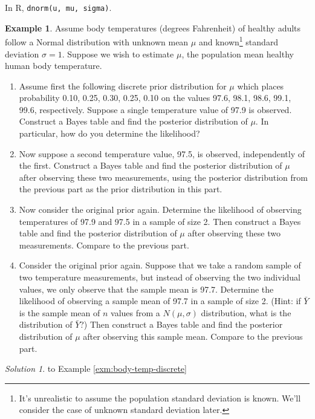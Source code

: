 \documentclass[
]{book}
\providecommand{\tightlist}{%
  \setlength{\itemsep}{0pt}\setlength{\parskip}{0pt}}
\theoremstyle{definition}
\theoremstyle{definition}
\newtheorem{example}{Example}[chapter]
\theoremstyle{definition}
\theoremstyle{remark}
\newtheorem*{solution}{Solution}
\begin{document}
In R, \texttt{dnorm(u,\ mu,\ sigma)}.

\begin{example}
\protect\hypertarget{exm:body-temp-discrete}{}{\label{exm:body-temp-discrete} }
Assume body temperatures (degrees Fahrenheit) of healthy adults follow a Normal distribution with unknown mean \(\mu\) and known\footnote{It's unrealistic to assume the population standard deviation is known. We'll consider the case of unknown standard deviation later.} standard deviation \(\sigma=1\).
Suppose we wish to estimate \(\mu\), the population mean healthy human body temperature.
\end{example}

\begin{enumerate}
\def\labelenumi{\arabic{enumi}.}
\tightlist
\item
  Assume first the following discrete prior distribution for \(\mu\) which places probability 0.10, 0.25, 0.30, 0.25, 0.10 on the values 97.6, 98.1, 98.6, 99.1, 99.6, respectively. Suppose a single temperature value of 97.9 is observed. Construct a Bayes table and find the posterior distribution of \(\mu\). In particular, how do you determine the likelihood?
\item
  Now suppose a second temperature value, 97.5, is observed, independently of the first. Construct a Bayes table and find the posterior distribution of \(\mu\) after observing these two measurements, using the posterior distribution from the previous part as the prior distribution in this part.
\item
  Now consider the original prior again.
  Determine the likelihood of observing temperatures of 97.9 and 97.5 in a sample of size 2. Then construct a Bayes table and find the posterior distribution of \(\mu\) after observing these two measurements. Compare to the previous part.
\item
  Consider the original prior again. Suppose that we take a random sample of two temperature measurements, but instead of observing the two individual values, we only observe that the sample mean is 97.7. Determine the likelihood of observing a sample mean of 97.7 in a sample of size 2. (Hint: if \(\bar{Y}\) is the sample mean of \(n\) values from a \(N(\mu, \sigma)\) distribution, what is the distribution of \(\bar{Y}\)?) Then construct a Bayes table and find the posterior distribution of \(\mu\) after observing this sample mean. Compare to the previous part.
\end{enumerate}

\begin{solution}
{}to Example \ref{exm:body-temp-discrete}
\end{solution}
\end{document}
